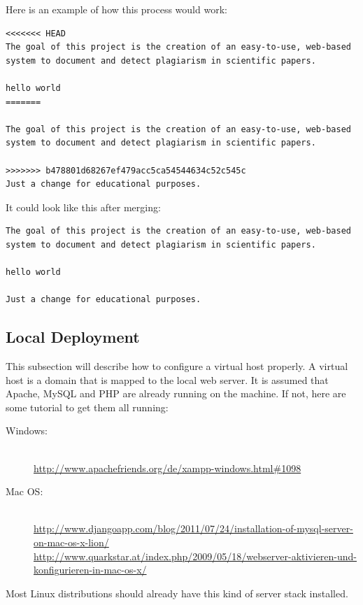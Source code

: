 Here is an example of how this process would work:

\begin{lstlisting}[caption=Conflicted file, keywordstyle=\color{black}]
<<<<<<< HEAD
The goal of this project is the creation of an easy-to-use, web-based
system to document and detect plagiarism in scientific papers.

hello world
=======

The goal of this project is the creation of an easy-to-use, web-based
system to document and detect plagiarism in scientific papers.

>>>>>>> b478801d68267ef479acc5ca54544634c52c545c
Just a change for educational purposes.
\end{lstlisting}

It could look like this after merging:


\begin{lstlisting}[caption=Fixed conflict after merging, keywordstyle=\color{black}]
The goal of this project is the creation of an easy-to-use, web-based
system to document and detect plagiarism in scientific papers.

hello world

Just a change for educational purposes.
\end{lstlisting}

\subsection{Local Deployment}

This subsection will describe how to configure a virtual host properly. A virtual host is a domain that is mapped to 
the local web server. It is assumed that Apache, MySQL and PHP are already running on the machine. If not, here are 
some tutorial to get them all running:

\begin{description}
\item [Windows:] \hfill \\
 \url{http://www.apachefriends.org/de/xampp-windows.html#1098}
\item [Mac OS:] \hfill \\
\url{http://www.djangoapp.com/blog/2011/07/24/installation-of-mysql-server-on-mac-os-x-lion/} 
\url{http://www.quarkstar.at/index.php/2009/05/18/webserver-aktivieren-und-konfigurieren-in-mac-os-x/}
\end{description}

Most Linux distributions should already have this kind of server stack installed.

